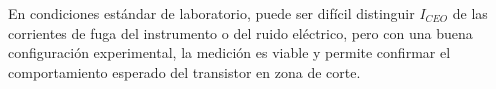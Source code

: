     En condiciones estándar de laboratorio, puede ser difícil distinguir $I_{CEO}$ de las corrientes de fuga del instrumento o del ruido eléctrico, pero con una buena configuración experimental, la medición es viable y permite confirmar el comportamiento esperado del transistor en zona de corte.


       
       
        
